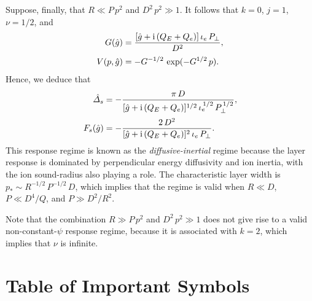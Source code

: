 \documentclass[12pt,prb,aps]{revtex4-1}
\begin{document}
Suppose, finally, that $R\ll P\,p^2$ and $D^2\,p^2\gg 1$. It follows that $k=0$, $j=1$, $\nu=1/2$, and
\begin{align}
G(\hat{g}) &= \frac{[\hat{g}+{\rm i}\,(Q_E+Q_e)]\,\iota_e\,P_\perp}{D^2},\\[0.5ex]
V(p,\hat{g})&= -G^{-1/2}\,\exp(-G^{1/2}\,p).
\end{align}
Hence, we deduce that
\begin{align}\label{edia}
\hat{\mit\Delta}_s&= -\frac{\pi\,D}{[\hat{g}+{\rm i}\,(Q_E+Q_e)]^{1/2}\,\iota_e^{\,1/2}\,P_\perp^{\,1/2}},\\[0.5ex]
F_s(\hat{g}) &= - \frac{2\,D^2}{[\hat{g}+{\rm i}\,(Q_E+Q_e)]^2\,\iota_e\,P_\perp}.\label{edib}
\end{align}
This response regime is known as the {\em diffusive-inertial}\/ regime because the
layer response is dominated by perpendicular energy diffusivity and ion inertia, with the ion sound-radius also playing a role.\cite{err3} The characteristic layer width is $p_\ast\sim
R^{-1/2}\,P^{-1/2}\,D$, which implies that the regime is valid when $R\ll D$, $P\ll D^4/Q$, and $P\gg D^2/R^2$. 

Note that the combination $R\gg P\,p^2$ and $D^2\,p^2\gg 1$ does not give rise to a valid non-constant-$\psi$ response regime, because
it is associated with $k=2$, which implies that $\nu$ is infinite.

\section{Table of Important Symbols}\label{symb}
\end{document}
